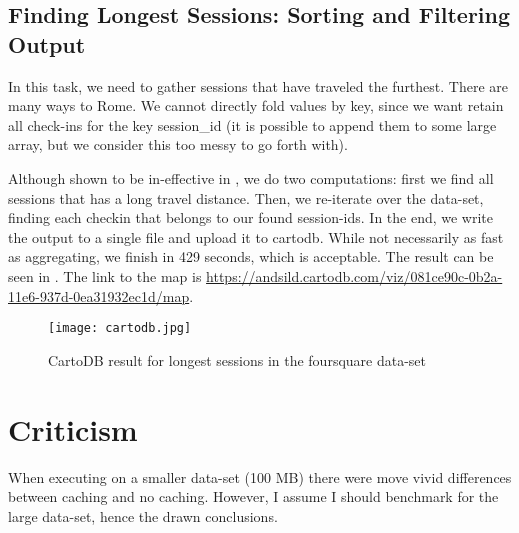 

\subsection{Finding Longest Sessions: Sorting and Filtering Output}
In this task, we need to gather sessions that have traveled the furthest.
There are many ways to Rome. We cannot directly fold values by key, since we want retain all check-ins for the key session\_id (it is possible to append them to some large array, but we consider this too messy to go forth with).

Although shown to be in-effective in , we do two computations: first we find all sessions that has a long travel distance. Then, we re-iterate over the data-set, finding each checkin that belongs to our found session-ids. In the end, we write the output to a single file and upload it to cartodb. While not necessarily as fast as aggregating, we finish in 429 seconds, which is acceptable. 
The result can be seen in . The link to the map is \url{https://andsild.cartodb.com/viz/081ce90c-0b2a-11e6-937d-0ea31932ec1d/map}.


\begin{figure}
    \centering
    \texttt{[image: cartodb.jpg]}
\caption{CartoDB result for longest sessions in the foursquare data-set}
\label{fig:cartoDB}
\end{figure}




\section{Criticism}
When executing on a smaller data-set (100 MB) there were move vivid differences between
caching and no caching. However, I assume I should benchmark for the large data-set, hence the drawn conclusions.
